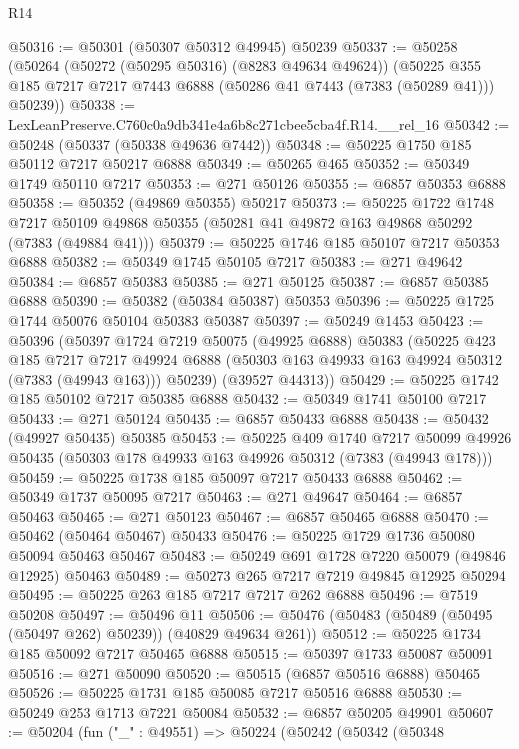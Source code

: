 \begin{lexlean}{R14}
\begin{coremodule}
@50316 := @50301 (@50307 @50312 @49945) @50239
@50337 := @50258
    (@50264
      (@50272 (@50295 @50316) (@8283 @49634 @49624))
      (@50225 @355 @185 @7217 @7217 @7443 @6888 (@50286 @41 @7443 (@7383 (@50289 @41))) @50239))
@50338 := LexLeanPreserve.C760c0a9db341e4a6b8c271cbee5cba4f.R14.__rel_16
@50342 := @50248 (@50337 (@50338 @49636 @7442))
@50348 := @50225 @1750 @185 @50112 @7217 @50217 @6888
@50349 := @50265 @465
@50352 := @50349 @1749 @50110 @7217
@50353 := @271 @50126
@50355 := @6857 @50353 @6888
@50358 := @50352 (@49869 @50355) @50217
@50373 := @50225
    @1722
    @1748
    @7217
    @50109
    @49868
    @50355
    (@50281 @41 @49872 @163 @49868 @50292 (@7383 (@49884 @41)))
@50379 := @50225 @1746 @185 @50107 @7217 @50353 @6888
@50382 := @50349 @1745 @50105 @7217
@50383 := @271 @49642
@50384 := @6857 @50383
@50385 := @271 @50125
@50387 := @6857 @50385 @6888
@50390 := @50382 (@50384 @50387) @50353
@50396 := @50225 @1725 @1744 @50076 @50104 @50383 @50387
@50397 := @50249 @1453
@50423 := @50396
    (@50397
      @1724
      @7219
      @50075
      (@49925 @6888)
      @50383
      (@50225
        @423
        @185
        @7217
        @7217
        @49924
        @6888
        (@50303 @163 @49933 @163 @49924 @50312 (@7383 (@49943 @163)))
        @50239)
      (@39527 @44313))
@50429 := @50225 @1742 @185 @50102 @7217 @50385 @6888
@50432 := @50349 @1741 @50100 @7217
@50433 := @271 @50124
@50435 := @6857 @50433 @6888
@50438 := @50432 (@49927 @50435) @50385
@50453 := @50225
    @409
    @1740
    @7217
    @50099
    @49926
    @50435
    (@50303 @178 @49933 @163 @49926 @50312 (@7383 (@49943 @178)))
@50459 := @50225 @1738 @185 @50097 @7217 @50433 @6888
@50462 := @50349 @1737 @50095 @7217
@50463 := @271 @49647
@50464 := @6857 @50463
@50465 := @271 @50123
@50467 := @6857 @50465 @6888
@50470 := @50462 (@50464 @50467) @50433
@50476 := @50225 @1729 @1736 @50080 @50094 @50463 @50467
@50483 := @50249 @691 @1728 @7220 @50079 (@49846 @12925) @50463
@50489 := @50273 @265 @7217 @7219 @49845 @12925 @50294
@50495 := @50225 @263 @185 @7217 @7217 @262 @6888
@50496 := @7519 @50208
@50497 := @50496 @11
@50506 := @50476 (@50483 (@50489 (@50495 (@50497 @262) @50239)) (@40829 @49634 @261))
@50512 := @50225 @1734 @185 @50092 @7217 @50465 @6888
@50515 := @50397 @1733 @50087 @50091
@50516 := @271 @50090
@50520 := @50515 (@6857 @50516 @6888) @50465
@50526 := @50225 @1731 @185 @50085 @7217 @50516 @6888
@50530 := @50249 @253 @1713 @7221 @50084
@50532 := @6857 @50205 @49901
@50607 := @50204
    (fun ("_" : @49551) =>
    @50224
      (@50242
        (@50342
          (@50348

\end{coremodule}
\end{lexlean}
